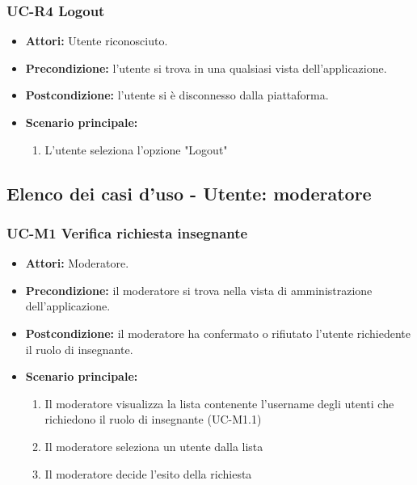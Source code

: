 \subsubsection{UC-R4 Logout}
\begin{itemize}
		\item \textbf{Attori:} Utente riconosciuto.
		\item \textbf{Precondizione:} l'utente si trova in una qualsiasi vista dell'applicazione.
		\item \textbf{Postcondizione:} l'utente si è disconnesso dalla piattaforma.
		\item \textbf{Scenario principale:}
		\begin{enumerate}
			\item L'utente seleziona l'opzione "Logout"
		\end{enumerate}
	\end{itemize}

\subsection{Elenco dei casi d'uso - Utente: moderatore}	
\subsubsection{UC-M1 Verifica richiesta insegnante}
		\begin{itemize}
			\item \textbf{Attori:} Moderatore.
			\item \textbf{Precondizione:} il moderatore si trova nella vista di amministrazione dell'applicazione.
			\item \textbf{Postcondizione:} il moderatore ha confermato o rifiutato l'utente richiedente il ruolo di insegnante.
			\item \textbf{Scenario principale:}
				\begin{enumerate}
					\item Il moderatore visualizza la lista contenente l'username degli utenti che richiedono il ruolo di insegnante (UC-M1.1)
					\item Il moderatore seleziona un utente dalla lista
					\item Il moderatore decide l'esito della richiesta
				\end{enumerate}
		\end{itemize}	
		
